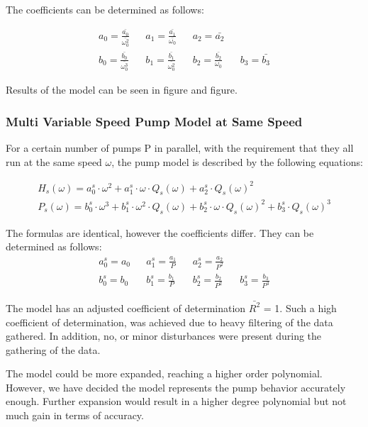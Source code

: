 The coefficients can be determined as follows:

\begin{align*}
	a_0 = \frac{\bar{a_0}}{\bar{\omega_0^2}} && a_1 = \frac{\bar{a_1}}{\bar{\omega_0}} && a_2 = \bar{a_2} \\
	b_0 = \frac{\bar{b_0}}{\bar{\omega_0^3}} && b_1 = \frac{\bar{b_1}}{\bar{\omega_0^2}} && b_2 = \frac{\bar{b_2}}{\omega_0} && b_3 = \bar{b_3}
\end{align*}

Results of the model can be seen in figure and figure.
\subsubsection{Multi Variable Speed Pump Model at Same Speed}
For a certain number of pumps P in parallel, with the requirement that they all run at the same speed $\omega$, the pump model is
described by the following equations:

\begin{equation}
	\begin{aligned}
	H_s(\omega) = a_0^s \cdot \omega^2 + a_1^s \cdot \omega \cdot Q_s(\omega) + a_2^s \cdot Q_s(\omega)^2 \\
	P_s(\omega) = b_0^s \cdot \omega^3 + b_1^s \cdot \omega^2 \cdot Q_s(\omega) + b_2^s \cdot \omega \cdot Q_s(\omega)^2 + b_3^s \cdot Q_s(\omega)^3
	\end{aligned}
\end{equation}

The formulas are identical, however the coefficients differ. They can be determined as follows:
\begin{align*}
	a_0^s = a_0 && a_1^s = \frac{a_1}{P} && a_2^s = \frac{a_2}{P^2} \\
	b_0^s = b_0 && b_1^s = \frac{b_1}{P} && b_2^s = \frac{b_2}{P^2} && b_3^s = \frac{b_3}{P^3}
\end{align*}

\newpage
The model has an adjusted coefficient of determination  $\bar{R^2}$ = 1. Such a high coefficient of determination, was achieved due to
heavy filtering of the data gathered. In addition, no, or minor disturbances were present during the gathering of the data.

The model could be more expanded, reaching a higher order polynomial. However, we have decided the model represents the pump behavior 
accurately enough. Further expansion would result in a higher degree polynomial but not much gain in terms of accuracy.

